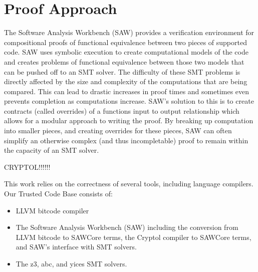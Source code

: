 
\section{Proof Approach}\label{sec:proof}


The Software Analysis Workbench (SAW) provides a verification environment for compositional proofs of functional equivalence between two pieces of supported code.  
SAW uses symbolic execution to create computational models of the code and creates problems of functional equivalence between those two models that can be pushed off to an SMT solver.  
The difficulty of these SMT problems is directly affected by the size and complexity of the computations that are being compared.  
This can lead to drastic increases in proof times and sometimes even prevents completion as computations increase.  
SAW’s solution to this is to create contracts (called overrides) of a functions input to output relationship which allows for a modular approach to writing the proof.  
By breaking up computation into smaller pieces, and creating overrides for these pieces, SAW can often simplify an otherwise complex (and thus incompletable) proof to remain within the capacity of an SMT solver.

CRYPTOL!!!!!!


This work relies on the correctness of several tools, including language compilers.  
Our Trusted Code Base consists of:
\begin{itemize}
  \item LLVM bitcode compiler
  \item The Software Analysis Workbench (SAW) including the conversion from LLVM bitcode to SAWCore terms, the Cryptol compiler to SAWCore terms, and SAW's interface with SMT solvers.
  \item The z3, abc, and yices SMT solvers.
\end{itemize}
